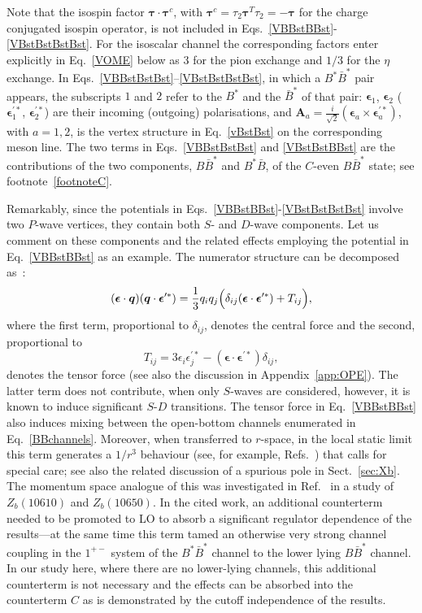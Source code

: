 \documentclass[aps,prd,showpacs,amsmath,twocolumn,superscriptaddress,floatfix,nofootinbib,notitlepage]{revtex4-2}
\newcommand{\veq}{{\bm q}}
\newcommand{\veA}{{\bm A}}
\newcommand{\vetau}{{\bm \tau}}
\newcommand{\be}{\begin{equation}}
\newcommand{\ee}{\end{equation}}
\newcommand{\veep}{{\bm \epsilon}}
\newcommand{\veepst}{{\bm \epsilon}^{\prime*}}
\begin{document}
Note that the isospin factor $\vetau\cdot\vetau^c$, with $\vetau^c=\tau_2\vetau^T\tau_2=-\vetau$ for the charge conjugated isospin operator, is not included in Eqs.~\eqref{VBBstBBst}-\eqref{VBstBstBstBst}. For the isoscalar channel the corresponding factors enter explicitly in Eq.~\eqref{VOME} below as $3$ for the pion exchange and $1/3$ for the $\eta$ exchange.
In Eqs.~\eqref{VBBstBstBst}--\eqref{VBstBstBstBst}, in which a $B^*\bar{B}^*$ pair appears, the subscripts $1$ and $2$ refer to the $B^*$ and the $\bar{B}^*$ of that pair: $\veep_1$, $\veep_2$ ($\veep_1^{\prime *}$, $\veep_2^{\prime *}$) are their incoming (outgoing) polarisations, and $\veA_a=\frac{i}{\sqrt2}(\veep_a\times\veep_a^{\prime *})$, with $a=1,2$, is the vertex structure in Eq.~\eqref{vBstBst} on the corresponding meson line. The two terms in Eqs.~\eqref{VBBstBstBst} and \eqref{VBstBstBBst} are the contributions of the two components, $B\bar{B}^*$ and $B^*\bar{B}$, of the $C$-even $B\bar{B}^*$ state; see footnote~\ref{footnoteC}.

Remarkably, since the potentials in Eqs.~\eqref{VBBstBBst}-\eqref{VBstBstBstBst} involve two $P$-wave vertices, they contain both $S$- and $D$-wave components. Let us comment on these components and the related effects employing the potential in Eq.~\eqref{VBBstBBst} as an example. The numerator structure can be decomposed as~\cite{Ericson:1988gk}:
\be
(\veep\cdot \veq)(\veq\cdot\veepst) = \frac13 q_iq_j\Bigl(
\delta_{ij}(\veep\cdot\veepst)+T_{ij} 
\Bigr),
\label{decomp}
\ee
where the first term, proportional to $\delta_{ij}$,
denotes the central force and the second, proportional to 
\be
T_{ij}= 3\epsilon_i \epsilon_j^{\prime*}-(\veep\cdot\veepst)
\delta_{ij},
\label{Sij}
\ee
denotes the tensor force (see also the discussion in Appendix~\ref{app:OPE}).
The latter term does not contribute, when only $S$-waves are considered, however, it is known to induce significant $S$-$D$
transitions. The tensor force in Eq.~\eqref{VBBstBBst} also induces mixing between the open-bottom channels enumerated in Eq.~\eqref{BBchannels}. Moreover, when transferred to $r$-space, in the local static limit this term generates a $1/r^3$ behaviour
(see, for example, Refs.~\cite{Ericson:1988gk,
Tornqvist:1993ng,Thomas:2008ja}) that calls for special care; see also the related discussion of a spurious pole in Sect.~\ref{sec:Xb}. 
The momentum space analogue of this was investigated in Ref.~\cite{Wang:2018jlv}
in a study of $Z_b(10610)$ and $Z_b(10650)$.
In the cited work, an additional counterterm needed to be promoted to LO
to absorb a significant regulator dependence of the results---at the
same time this term tamed
an otherwise very strong channel coupling in the $1^{+-}$ system of the $B^*\bar{B}^*$ 
channel to the lower lying
$B\bar{B}^*$ channel. In our study here, where there are no lower-lying channels, this additional counterterm is not necessary and the effects can be absorbed into the counterterm $C$ as is demonstrated by the cutoff independence of the results.
\end{document}
